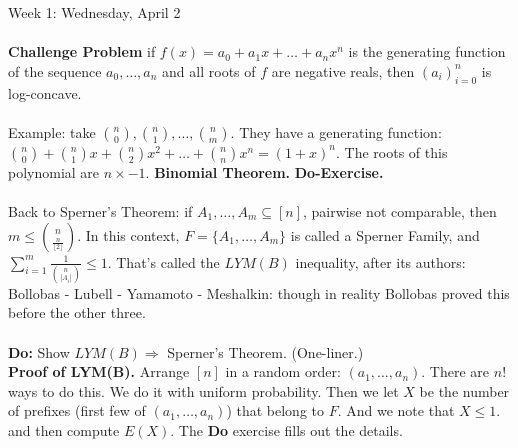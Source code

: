 \documentclass[12pt]{article}
\theoremstyle{remark}
\begin{document}
\begin{section}{Week 1: Wednesday, April 2}
\\\\\textbf{Challenge Problem} if $f(x) = a_0+a_1x+\ldots+a_nx^n$ is the generating function of the sequence $a_0,\ldots,a_n$ and all roots of $f$ are negative reals, then $(a_i)_{i=0}^n$ is log-concave.
\\\\Example: take ${n \choose 0}, {n \choose 1}, \ldots, {n \choose m}$. They have a generating function: ${n \choose 0} + {n \choose 1}x + {n \choose 2}x^2 + \ldots + {n \choose n}x^n = (1+x)^n$. The roots of this polynomial are $n \times -1$. \textbf{Binomial Theorem.} \textbf{Do-Exercise.}
\\\\Back to Sperner's Theorem: if $A_1,\ldots,A_m \subseteq [n]$, pairwise not comparable, then $m \leq {n \choose \frac{n}{\lfloor2\rfloor}}$. In this context, $F = \{ A_1,\ldots,A_m \}$ is called a Sperner Family, and $\sum_{i=1}^m \frac{1}{ {n \choose |A_i| }} \leq 1$. That's called the $LYM(B)$ inequality, after its authors: Bollobas - Lubell - Yamamoto - Meshalkin: though in reality Bollobas proved this before the other three. \\\\\textbf{Do:} Show $LYM(B) \Rightarrow$ Sperner's Theorem. (One-liner.) \\\textbf{Proof of LYM(B).} Arrange $[n]$ in a random order: $(a_1,\ldots,a_n)$. There are $n!$ ways to do this. We do it with uniform probability. Then we let $X$ be the number of prefixes (first few of $(a_1,\ldots,a_n)$) that belong to $F$. And we note that $X \leq 1$. and then compute $E(X)$. The \textbf{Do} exercise fills out the details.
\end{section}
\newpage
\end{document}
